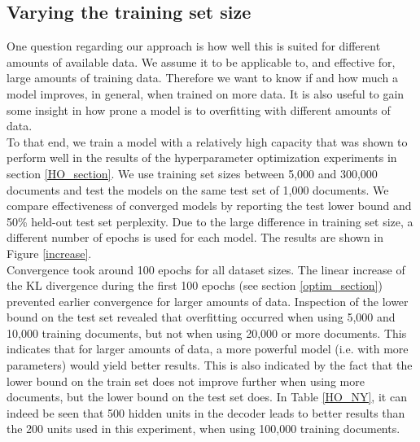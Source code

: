 \documentclass{report}
\begin{document}
	
	
	\subsection{Varying the training set size}
	One question regarding our approach is how well this is suited for different amounts of available data. We assume it to be applicable to, and effective for, large amounts of training data. Therefore we want to know if and how much a model improves, in general, when trained on more data. It is also useful to gain some insight in how prone a model is to overfitting with different amounts of data.\\
	To that end, we train a model with a relatively high capacity that was shown to perform well in the results of the hyperparameter optimization experiments in section \ref{HO_section}. We use training set sizes between 5,000 and 300,000 documents and test the models on the same test set of 1,000 documents. We compare effectiveness of converged models by reporting the test lower bound and 50\% held-out test set perplexity. Due to the large difference in training set size, a different number of epochs is used for each model. The results are shown in Figure \ref{increase}. \\
	Convergence took around 100 epochs for all dataset sizes. The linear increase of the KL divergence during the first 100 epochs (see section \ref{optim_section}) prevented earlier convergence for larger amounts of data.   Inspection of the lower bound on the test set revealed that overfitting occurred when using 5,000 and 10,000 training documents, but not when using 20,000 or more documents. This indicates that for larger amounts of data, a more powerful model (i.e. with more parameters) would yield better results. This is also indicated by the fact that the lower bound on the train set does not improve further when using more documents, but the lower bound on the test set does. In Table \ref{HO_NY}, it can indeed be seen that 500 hidden units in the decoder leads to better results than the 200 units used in this experiment, when using 100,000 training documents.
	
\end{document}
